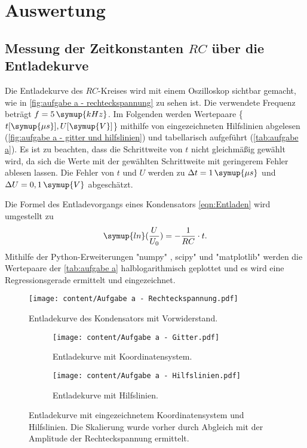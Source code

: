 \section{Auswertung}
\label{sec:Auswertung}
\subsection{Messung der Zeitkonstanten $RC$ über die Entladekurve}
Die Entladekurve des $RC$-Kreises wird mit einem Oszilloskop sichtbar gemacht, wie 
in \autoref{fig:aufgabe a - rechteckspannung} zu sehen ist. Die verwendete Frequenz beträgt $f=5\,\symup{kHz}$.
Im Folgenden werden Wertepaare \{$t [\symup{\mu s}], U [\symup{V}]$\} mithilfe von eingezeichneten Hilfslinien abgelesen
(\autoref{fig:aufgabe a - gitter und hilfslinien}) und tabellarisch aufgeführt (\autoref{tab:aufgabe a}). Es ist zu beachten,
dass die Schrittweite von $t$ nicht gleichmäßig gewählt wird, da sich die Werte mit der gewählten Schrittweite mit
geringerem Fehler ablesen lassen. Die Fehler von $t$ und $U$ werden zu
 $\Delta t = 1\,\symup{\mu s}$ und $\Delta U = 0,1\,\symup{V}$ abgeschätzt.

 Die Formel des Entladevorgangs eines Kondensators \autoref{eqn:Entladen} wird umgestellt zu
 \begin{equation}
   \symup{ln}(\frac{U}{U_{0}}) = -\frac{1}{RC}\cdot t.
 \end{equation}
 Mithilfe der Python-Erweiterungen "numpy" \cite{numpy}, \dq scipy" \cite{scipy} und "matplotlib" \cite{matplotlib} werden die Wertepaare der 
 \autoref{tab:aufgabe a} halblogarithmisch geplottet und es wird eine Regressionsgerade ermittelt und eingezeichnet. 

\begin{figure}
  \centering
  \texttt{[image: content/Aufgabe a - Rechteckspannung.pdf]}
  \caption{Entladekurve des Kondensators mit Vorwiderstand.}
  \label{fig:aufgabe a - rechteckspannung}
\end{figure}

\begin{figure}
  \begin{subfigure}{0.48\textwidth}
    \centering
    \texttt{[image: content/Aufgabe a - Gitter.pdf]}
    \caption{Entladekurve mit Koordinatensystem.}
    \label{fig:aufgabe a - gitter}
  \end{subfigure}
  \hfill
  \begin{subfigure}{0.48\textwidth}
    \centering
    \texttt{[image: content/Aufgabe a - Hilfslinien.pdf]}
    \caption{Entladekurve mit Hilfslinien.}
    \label{fig:aufgabe a - hilfslinien}
  \end{subfigure}
  \caption{Entladekurve mit eingezeichnetem Koordinatensystem und Hilfslinien. Die %
    Skalierung wurde vorher durch Abgleich mit der Amplitude der Rechteckspannung ermittelt.}
  \label{fig:aufgabe a - gitter und hilfslinien}
\end{figure}


